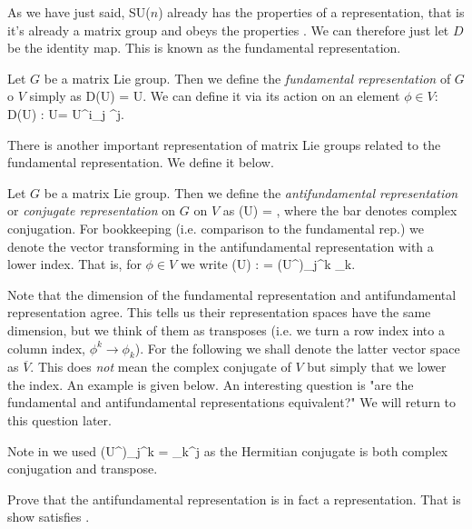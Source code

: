 As we have just said, SU($n$) already has the properties of a representation, that is it's already a matrix group and obeys the properties . We can therefore just let $D$ be the identity map. This is known as the fundamental representation. 

    Let $G$ be a matrix Lie group. Then we define the \textit{fundamental representation} of $G$ o $V$ simply as 
    \be 
    \label{eqn:FundamentalRepGroup}
        D(U) = U.
    \ee 
    We can define it via its action on an element $\phi\in V$:
    \be 
    \label{eqn:FundamentalRepGroupAction}
        D(U) : \phi \mapsto U\phi = {U^i}_j \phi^j.
    \ee 
\ed 

There is another important representation of matrix Lie groups related to the fundamental representation. We define it below. 

    Let $G$ be a matrix Lie group. Then we define the \textit{antifundamental representation} or \textit{conjugate representation} on $G$ on $V$ as
    \be 
    \label{eqn:AntifundamentalRepGroup}
        (U) = ,
    \ee 
    where the bar denotes complex conjugation. For bookkeeping (i.e. comparison to the fundamental rep.) we denote the vector transforming in the antifundamental representation with a lower index. That is, for $\phi\in V$ we write 
    \be
    \label{eqn:AntifundamentalRepGroupAction}
        (U) : \phi \mapsto {}\phi = {(U^{\dagger})_j}^k \phi_k.
    \ee 
\ed 

Note that the dimension of the fundamental representation and antifundamental representation agree. This tells us their representation spaces have the same dimension, but we think of them as transposes (i.e. we turn a row index into a column index, $\phi^k \to \phi_k$). For the following we shall denote the latter vector space as $\overline{V}$. This does \textit{not} mean the complex conjugate of $V$ but simply that we lower the index. An example is given below. An interesting question is "are the fundamental and antifundamental representations equivalent?" We will return to this question later. 

\br 
    Note in  we used 
    \bse 
        {(U^{\dagger})_j}^k = {_k}^j
    \ese 
    as the Hermitian conjugate is both complex conjugation and transpose. 
\er 

\bbox 
    Prove that the antifundamental representation is in fact a representation. That is show  satisfies .
\ebox 


